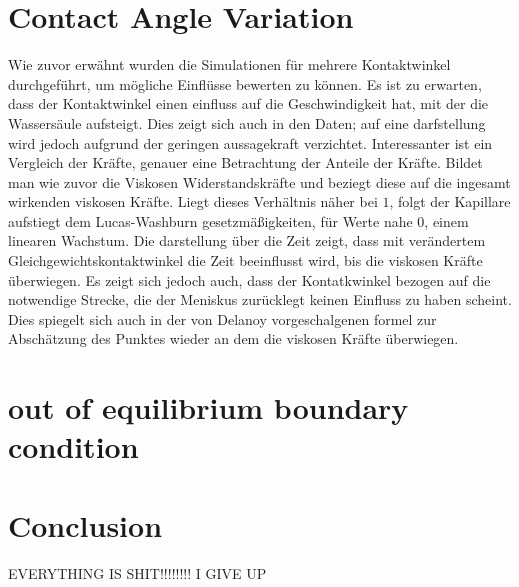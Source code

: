 \section{Contact Angle Variation}
Wie zuvor erwähnt wurden die Simulationen für mehrere Kontaktwinkel durchgeführt, um mögliche Einflüsse bewerten zu können. Es ist zu erwarten, dass der Kontaktwinkel einen einfluss auf die Geschwindigkeit hat, mit der die Wassersäule aufsteigt. Dies zeigt sich auch in den Daten; auf eine darfstellung wird jedoch aufgrund der geringen aussagekraft verzichtet. Interessanter ist ein Vergleich der Kräfte, genauer eine Betrachtung der Anteile der Kräfte. Bildet man wie zuvor die Viskosen Widerstandskräfte und beziegt diese auf die ingesamt wirkenden viskosen Kräfte. Liegt dieses Verhältnis näher bei $1$, folgt der Kapillare aufstiegt dem Lucas-Washburn gesetzmäßigkeiten, für Werte nahe $0$, einem linearen Wachstum. Die darstellung über die Zeit zeigt, dass mit verändertem Gleichgewichtskontaktwinkel die Zeit beeinflusst wird, bis die viskosen Kräfte überwiegen. Es zeigt sich jedoch auch, dass der Kontatkwinkel bezogen auf die notwendige Strecke, die der Meniskus zurücklegt keinen Einfluss zu haben scheint. Dies spiegelt sich auch in der von Delanoy vorgeschalgenen formel zur Abschätzung des Punktes wieder an dem die viskosen Kräfte überwiegen.




\section{out of equilibrium boundary condition}




\section{Conclusion}

EVERYTHING IS SHIT!!!!!!!!
I GIVE UP